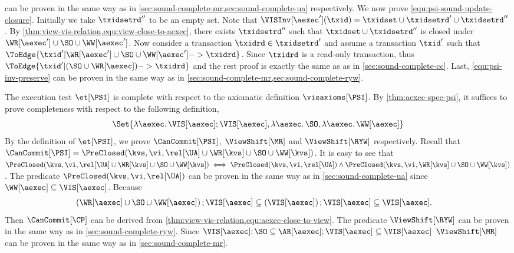 can be proven in the same way as in \cref{sec:sound-complete-mr,sec:sound-complete-ua} respectively.
We now prove \cref{equ:psi-sound-update-closure}.
Initially we take \( \txidsetrd'' \) to be an empty set.
Note that \(\VISInv[\aexec'](\txid) = \txidset \cup \txidsetrd' \cup \txidsetrd'' \).
By \cref{thm:view-vis-relation,equ:view-close-to-aexec}, there exists \( \txidsetrd'' \) such that
\( \txidset \cup \txidsetrd'' \) is closed under \( \WR[\aexec'] \cup \SO \cup \WW[\aexec']\).
Now consider a transaction \( \txidrd \in \txidsetrd' \) and
assume a transaction \( \txid' \) such that \( \ToEdge{ \txid' | \WR[\aexec'] \cup \SO \cup \WW[\aexec'] -> \txidrd } \).
Since \( \txidrd \) is a read-only transaction, thus
\( \ToEdge{ \txid' |  (\SO \cup \WR[\aexec] )  -> \txidrd } \)
and the rest proof is exactly the same as as in \cref{sec:sound-complete-cc}.
Last, \cref{equ:psi-inv-preserve} can be proven in the same way as in \cref{sec:sound-complete-mr,sec:sound-complete-ryw}.

The execution test $\et[\PSI]$ is complete with respect to the axiomatic definition \( \visaxioms[\PSI] \).
By \cref{thm:aexec-spec-psi}, it suffices to prove completeness with respect to the following definition,
\[
\Set{\lambda \aexec \ldotp \VIS[\aexec] ; \VIS[\aexec], \lambda \aexec \ldotp \SO , \lambda \aexec \ldotp \WW[\aexec] }
\]
\COMPLETELET{\PSI}
By the definition of \( \et[\PSI]\), we prove \( \CanCommit[\PSI] \), \( \ViewShift[\MR]\) and \( \ViewShift[\RYW]\) respectively.
Recall that \( \CanCommit[\PSI] = \PreClosed(\kvs,\vi,\rel[\UA] \cup \WR[\kvs] \cup \SO \cup \WW[\kvs]) \).
It is easy to see that 
\( \PreClosed(\kvs,\vi,\rel[\UA] \cup \WR[\kvs] \cup \SO \cup \WW[\kvs]) \iff \PreClosed(\kvs,\vi,\rel[\UA]) 
            \land \PreClosed(\kvs,\vi,\WR[\kvs] \cup \SO \cup \WW[\kvs]) \).
The predicate \( \PreClosed(\kvs,\vi,\rel[\UA]) \) can be proven in the same way as in \cref{sec:sound-complete-ua}
since \( \WW[\aexec] \subseteq \VIS[\aexec]\).
Because 
\begin{align*}
\left( \WR[\aexec] \cup \SO \cup \WW[\aexec] \right) ; \VIS[\aexec] 
        & \subseteq \left( \VIS[\aexec] \right) ;  \VIS[\aexec] \subseteq \VIS[\aexec] .
\end{align*}
Then \( \CanCommit[\CP]\) can be derived from \cref{thm:view-vis-relation,equ:aexec-close-to-view}.
The predicate \( \ViewShift[\RYW] \) can be proven in the same way as in \cref{sec:sound-complete-ryw}.
Since \( \VIS[\aexec] ; \SO \subseteq \AR[\aexec] ; \VIS[\aexec] \subseteq \VIS[\aexec] \)
\( \ViewShift[\MR] \) can be proven in the same way as in \cref{sec:sound-complete-mr}.
